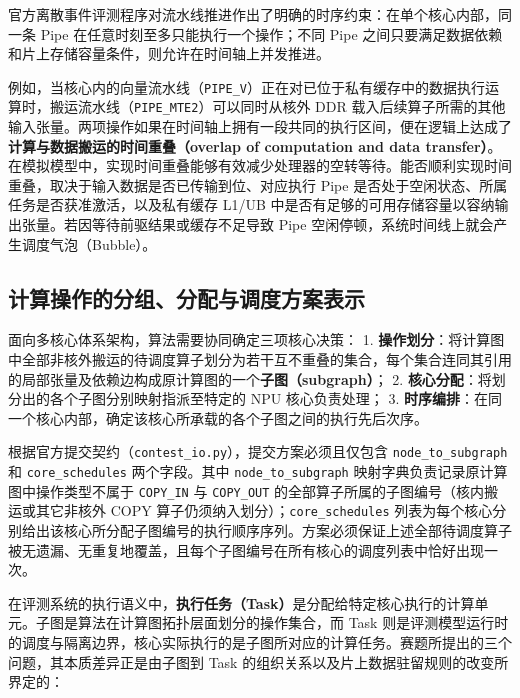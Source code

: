 \documentclass[anonymous,notoc]{gmcm2026}
\begin{document}
官方离散事件评测程序对流水线推进作出了明确的时序约束：在单个核心内部，同一条 Pipe 在任意时刻至多只能执行一个操作；不同 Pipe 之间只要满足数据依赖和片上存储容量条件，则允许在时间轴上并发推进。

例如，当核心内的向量流水线（\texttt{PIPE\_V}）正在对已位于私有缓存中的数据执行运算时，搬运流水线（\texttt{PIPE\_MTE2}）可以同时从核外 DDR 载入后续算子所需的其他输入张量。两项操作如果在时间轴上拥有一段共同的执行区间，便在逻辑上达成了\textbf{计算与数据搬运的时间重叠（overlap of computation and data transfer）}。在模拟模型中，实现时间重叠能够有效减少处理器的空转等待。能否顺利实现时间重叠，取决于输入数据是否已传输到位、对应执行 Pipe 是否处于空闲状态、所属任务是否获准激活，以及私有缓存 L1/UB 中是否有足够的可用存储容量以容纳输出张量。若因等待前驱结果或缓存不足导致 Pipe 空闲停顿，系统时间线上就会产生调度气泡（Bubble）。

\subsection{计算操作的分组、分配与调度方案表示}

面向多核心体系架构，算法需要协同确定三项核心决策： 1. \textbf{操作划分}：将计算图中全部非核外搬运的待调度算子划分为若干互不重叠的集合，每个集合连同其引用的局部张量及依赖边构成原计算图的一个\textbf{子图（subgraph）}； 2. \textbf{核心分配}：将划分出的各个子图分别映射指派至特定的 NPU 核心负责处理； 3. \textbf{时序编排}：在同一个核心内部，确定该核心所承载的各个子图之间的执行先后次序。

根据官方提交契约（\texttt{contest\_io.py}），提交方案必须且仅包含 \texttt{node\_to\_subgraph} 和 \texttt{core\_schedules} 两个字段。其中 \texttt{node\_to\_subgraph} 映射字典负责记录原计算图中操作类型不属于 \texttt{COPY\_IN} 与 \texttt{COPY\_OUT} 的全部算子所属的子图编号（核内搬运或其它非核外 COPY 算子仍须纳入划分）；\texttt{core\_schedules} 列表为每个核心分别给出该核心所分配子图编号的执行顺序序列。方案必须保证上述全部待调度算子被无遗漏、无重复地覆盖，且每个子图编号在所有核心的调度列表中恰好出现一次。

在评测系统的执行语义中，\textbf{执行任务（Task）}是分配给特定核心执行的计算单元。子图是算法在计算图拓扑层面划分的操作集合，而 Task 则是评测模型运行时的调度与隔离边界，核心实际执行的是子图所对应的计算任务。赛题所提出的三个问题，其本质差异正是由子图到 Task 的组织关系以及片上数据驻留规则的改变所界定的：
\end{document}
